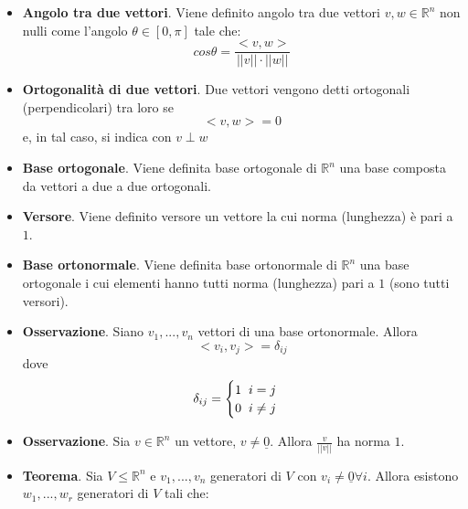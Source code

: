 \documentclass[12pt,a4paper,oneside]{book}
\begin{document}
\begin{itemize}
\item \textbf{Angolo tra due vettori}. \linebreak
	  Viene definito angolo tra due vettori $v, w\in\mathbb{R}^n$ non nulli come l'angolo $\theta\in[0, 
	  \pi]$ tale che: $$cos\theta = \frac{<v, w>}{||v||\cdot||w||}$$
	
\item \textbf{Ortogonalità di due vettori}. \linebreak
	  Due vettori vengono detti ortogonali (perpendicolari) tra loro se $$<v, w> = 0$$ e, in tal caso, si 
	  indica con $v\perp w$
	
\item \textbf{Base ortogonale}. \linebreak
	  Viene definita base ortogonale di $\mathbb{R}^n$ una base composta da vettori a due a due ortogonali.
	
\item \textbf{Versore}.
	  Viene definito versore un vettore la cui norma (lunghezza) è pari a $1$.
	
\item \textbf{Base ortonormale}. \linebreak
	  Viene definita base ortonormale di $\mathbb{R}^n$ una base ortogonale i cui elementi hanno tutti 
	  norma (lunghezza) pari a $1$ (sono tutti versori).
	
\item \textbf{Osservazione}. \linebreak
	  Siano $v_1, ..., v_n$ vettori di una base ortonormale. Allora $$<v_i, v_j> = \delta_{ij}$$ dove
	  $$\delta_{ij}=\begin{cases}
	  1 \hspace{0.2cm} i=j \\
	  0 \hspace{0.2cm} i\neq j\\
	  \end{cases}$$
	
\item \textbf{Osservazione}. \linebreak
	  Sia $v\in\mathbb{R}^n$ un vettore, $v\neq\underline{0}$. Allora $\frac{v}{||v||}$ ha norma $1$.
	
\item \textbf{Teorema}. \linebreak
	  Sia $V\leq \mathbb{R}^n$ e $v_1, ..., v_n$ generatori di $V$ con $v_i\neq\underline{0}\forall i$.
	  Allora esistono $w_1, ..., w_r$ generatori di $V$ tali che:
	  

\end{itemize}
\end{document}
